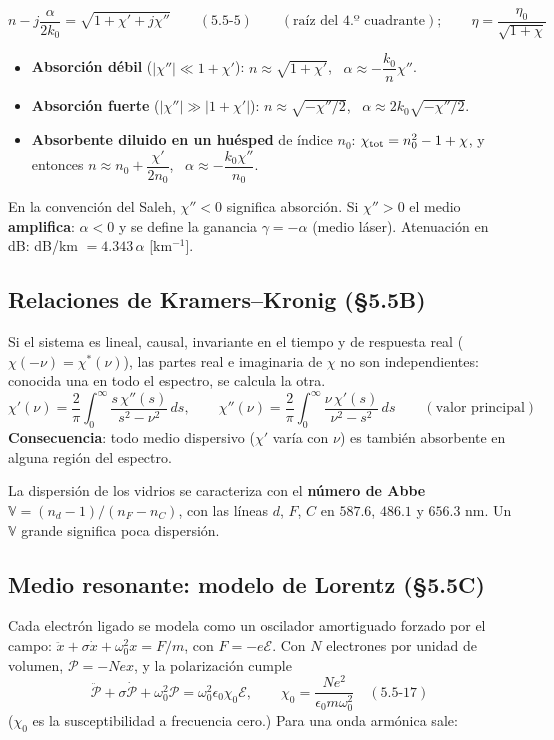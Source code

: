 \documentclass[10pt]{article}
\begin{document}
\begin{clave}[title={Índice y absorción a partir de $\chi$}]
\[
n-j\frac{\alpha}{2k_0}=\sqrt{1+\chi'+j\chi''}\qquad(5.5\text{-}5)\qquad(\text{raíz del 4.º cuadrante});\qquad \eta=\frac{\eta_0}{\sqrt{1+\chi}}
\]
\begin{itemize}[leftmargin=1.2em]
\item \textbf{Absorción débil} ($|\chi''|\ll1+\chi'$): $n\approx\sqrt{1+\chi'}$, \ $\alpha\approx-\dfrac{k_0}{n}\chi''$.
\item \textbf{Absorción fuerte} ($|\chi''|\gg|1+\chi'|$): $n\approx\sqrt{-\chi''/2}$, \ $\alpha\approx2k_0\sqrt{-\chi''/2}$.
\item \textbf{Absorbente diluido en un huésped} de índice $n_0$: $\chi_{\rm tot}=n_0^2-1+\chi$, y entonces $n\approx n_0+\dfrac{\chi'}{2n_0}$, \ $\alpha\approx-\dfrac{k_0\chi''}{n_0}$.
\end{itemize}
\end{clave}
En la convención del Saleh, $\chi''<0$ significa absorción. Si $\chi''>0$ el medio \textbf{amplifica}: $\alpha<0$ y se define la ganancia $\gamma=-\alpha$ (medio láser). Atenuación en dB: dB/km $=4.343\,\alpha$ [km$^{-1}$].

\subsection{Relaciones de Kramers–Kronig (§5.5B)}
Si el sistema es lineal, causal, invariante en el tiempo y de respuesta real ($\chi(-\nu)=\chi^*(\nu)$), las partes real e imaginaria de $\chi$ no son independientes: conocida una en todo el espectro, se calcula la otra.
\[
\chi'(\nu)=\frac2\pi\int_0^\infty\frac{s\,\chi''(s)}{s^2-\nu^2}\,ds,\qquad
\chi''(\nu)=\frac2\pi\int_0^\infty\frac{\nu\,\chi'(s)}{\nu^2-s^2}\,ds\qquad(\text{valor principal})
\]
\textbf{Consecuencia}: todo medio dispersivo ($\chi'$ varía con $\nu$) es también absorbente en alguna región del espectro.

La dispersión de los vidrios se caracteriza con el \textbf{número de Abbe} $\mathbb V=(n_d-1)/(n_F-n_C)$, con las líneas $d$, $F$, $C$ en $587.6$, $486.1$ y $656.3$ nm. Un $\mathbb V$ grande significa poca dispersión.

\subsection{Medio resonante: modelo de Lorentz (§5.5C)}
Cada electrón ligado se modela como un oscilador amortiguado forzado por el campo: $\ddot x+\sigma\dot x+\omega_0^2x=F/m$, con $F=-e\mathcal E$. Con $N$ electrones por unidad de volumen, $\mathcal P=-Nex$, y la polarización cumple
\[
\ddot{\mathcal P}+\sigma\dot{\mathcal P}+\omega_0^2\mathcal P=\omega_0^2\epsilon_0\chi_0\mathcal E,\qquad \chi_0=\frac{Ne^2}{\epsilon_0m\omega_0^2}\quad(5.5\text{-}17)
\]
($\chi_0$ es la susceptibilidad a frecuencia cero.) Para una onda armónica sale:
\end{document}
